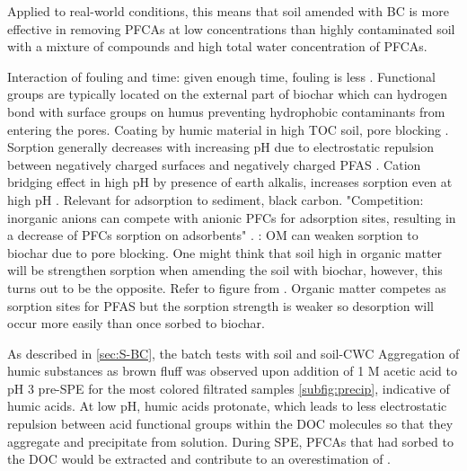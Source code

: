 Applied to real-world conditions, this means that soil amended with BC is more effective in removing PFCAs at low concentrations than highly contaminated soil with a mixture of compounds and high total water concentration of PFCAs.

Interaction of fouling and time: given enough time, fouling is less \citep{Werner2006}. Functional groups are typically located on the external part of biochar which can hydrogen bond with surface groups on humus preventing hydrophobic contaminants from entering the pores. Coating by humic material in high TOC soil, pore blocking \citep{Hale2011}.
Sorption generally decreases with increasing pH due to electrostatic repulsion between negatively charged surfaces and negatively charged PFAS \citep{du2014adsorption}. Cation bridging effect in high pH by presence of earth alkalis, increases sorption even at high pH \citep{du2014adsorption}. Relevant for adsorption to sediment, black carbon. "Competition: inorganic anions can compete with anionic PFCs for adsorption sites, resulting in a decrease of PFCs sorption on adsorbents" \citep{du2014adsorption}. 
\citep{Sormo2021}: OM can weaken sorption to biochar due to pore blocking. One might think that soil high in organic matter will be strengthen sorption when amending the soil with biochar, however, this turns out to be the opposite. Refer to figure from \citep{Cornelissen2005}. Organic matter competes as sorption sites for PFAS but the sorption strength is weaker so desorption will occur more easily than once sorbed to biochar. 

As described in \cref{sec:S-BC}, the batch tests with soil and soil-CWC Aggregation of humic substances as brown fluff was observed upon addition of 1 M acetic acid to pH 3 pre-SPE for the most colored filtrated samples \cref{subfig:precip}, indicative of humic acids. At low pH, humic acids protonate, which leads to less electrostatic repulsion between acid functional groups within the DOC molecules so that they aggregate and precipitate from solution. During SPE, PFCAs that had sorbed to the DOC would be extracted and contribute to an overestimation of . 

